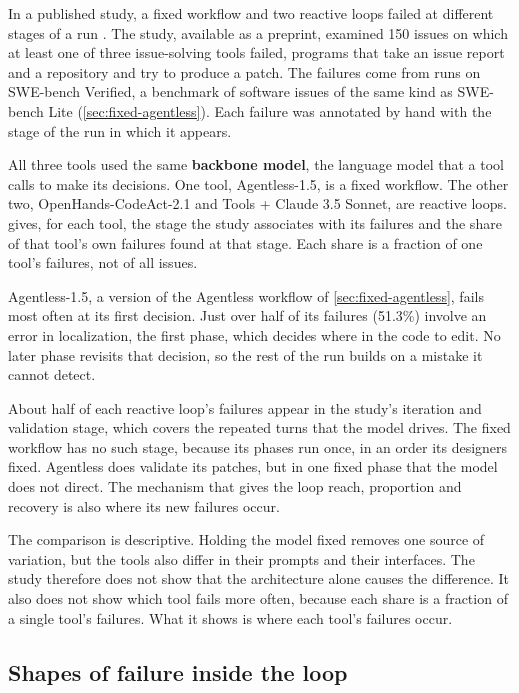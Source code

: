 In a published study, a fixed workflow and two reactive loops failed at different stages of a run
\citep{liu2025issuefailures}. The study, available as a preprint, examined 150 issues on which at
least one of three issue-solving tools failed, programs that take an issue report and a repository
and try to produce a patch.
The failures come from runs on SWE-bench Verified, a benchmark of software issues of the same kind
as SWE-bench Lite (\cref{sec:fixed-agentless}). Each failure was annotated by hand with the stage of
the run in which it appears.

All three tools used the same \textbf{backbone model}, the language model that a tool calls to make
its decisions. One tool, Agentless-1.5, is a fixed workflow. The other two, OpenHands-CodeAct-2.1
and Tools + Claude 3.5 Sonnet, are reactive loops.  gives, for each
tool, the stage the study associates with its failures and the share of that tool's own failures
found at that stage. Each share is a fraction of one tool's failures, not of all issues.

Agentless-1.5, a version of the Agentless workflow of \cref{sec:fixed-agentless}, fails most often
at its first decision. Just over half of its failures (51.3\%) involve an error in localization, the
first phase, which decides where in the code to edit. No later phase revisits that decision, so the
rest of the run builds on a mistake it cannot detect.

About half of each reactive loop's failures appear in the study's iteration and validation stage,
which covers the repeated turns that the model drives. The fixed workflow has no such stage, because
its phases run once, in an order its designers fixed. Agentless does validate its patches, but in
one fixed phase that the model does not direct. The mechanism that gives the loop reach, proportion
and recovery is also where its new failures occur.

The comparison is descriptive. Holding the model fixed removes one source of variation, but the
tools also differ in their prompts and their interfaces. The study therefore does not show that the
architecture alone causes the difference. It also does not show which tool fails more often, because
each share is a fraction of a single tool's failures. What it shows is where each tool's failures
occur.

\subsection{Shapes of failure inside the loop}
\label{sec:reactive-shapes}

